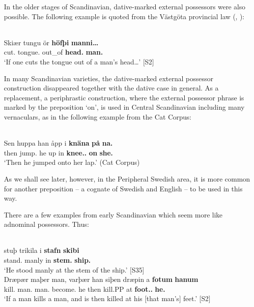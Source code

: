 In the older stages of Scandinavian, dative-marked external possessors were also possible. The following example is quoted from the Västgöta provincial law (\citet[15]{Wessén1956}, \citet[212]{Norde1997}): 

\ea\label{}
\\
\gll Skiær  tungu  ör  \textbf{höfþi} \textbf{manni…}\\
cut.{\prs}  tongue.{\acc}  out\_of  \textbf{head.{\dat}} \textbf{man.{\dat}}\\
\glt ‘If one cuts the tongue out of a man’s head…’ [S2]
\z

In many Scandinavian varieties, the dative-marked external possessor construction disappeared together with the dative case in general. As a replacement, a periphrastic construction, where the external possessor phrase is marked by the preposition  ‘on’, is used in Central Scandinavian including many vernaculars, as in the following example from the Cat Corpus: 

\ea\label{}
\\
\gll Sen  huppa  han  åpp  i  \textbf{knäna} \textbf{på} \textbf{na.}\\
then  jump.{\pst}  he  up  in  \textbf{knee.{}.{\pl}} \textbf{on} \textbf{she.{\obl}}\\
\glt ‘Then he jumped onto her lap.’ (Cat Corpus)
\z

As we shall see later, however, in the Peripheral Swedish area, it is more common for another preposition – a cognate of Swedish  and English  – to be used in this way.

There are a few examples from early Scandinavian which seem more like adnominal possessors. Thus:

\ea\label{}
	\ea 
		\\
		\gll stuþ  trikila  i  \textbf{stafn} \textbf{skibi}\\
		stand.{\pst}  manly  in  \textbf{stem.{\dat}} \textbf{ship.{\dat}}\\
		\glt ‘He stood manly at the stem of the ship.’ [S35]
	\ex 
		\\
		\gll Dræpær  maþer  man, varþær  han  siþen  dræpin  a  \textbf{fotum} \textbf{hanum}\\
		kill.{\prs}  man.{\nom}  man.{\acc} become.{\prs}  he  then  kill.PP  at  \textbf{foot.{\dat}.{\pl}} \textbf{he.{\dat}}\\
		\glt ‘If a man kills a man, and is then killed at his [that man’s] feet.’ [S2]
	\z 
\z

